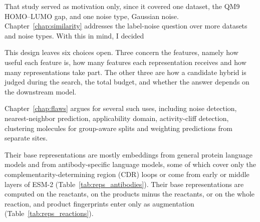 That study served as motivation only, since it covered one dataset, the QM9 HOMO--LUMO gap, and one noise type, Gaussian noise. Chapter~\ref{chap:similarity} addresses the label-noise question over more datasets and noise types.
With this in mind, I decided

This design leaves six choices open. Three concern the features, namely how useful each feature is, how many features each representation receives and how many representations take part. The other three are how a candidate hybrid is judged during the search, the total budget, and whether the answer depends on the downstream model.

Chapter~\ref{chap:flaws} argues for several such uses, including noise detection, nearest-neighbor prediction, applicability domain, activity-cliff detection, clustering molecules for group-aware splits and weighting predictions from separate sites.

Their base representations are mostly embeddings from general protein language models and from antibody-specific language models, some of which cover only the complementarity-determining region (CDR) loops or come from early or middle layers of ESM-2 (Table~\ref{tab:reps_antibodies}).
Their base representations are computed on the reactants, on the products minus the reactants, or on the whole reaction, and product fingerprints enter only as augmentation (Table~\ref{tab:reps_reactions}).

